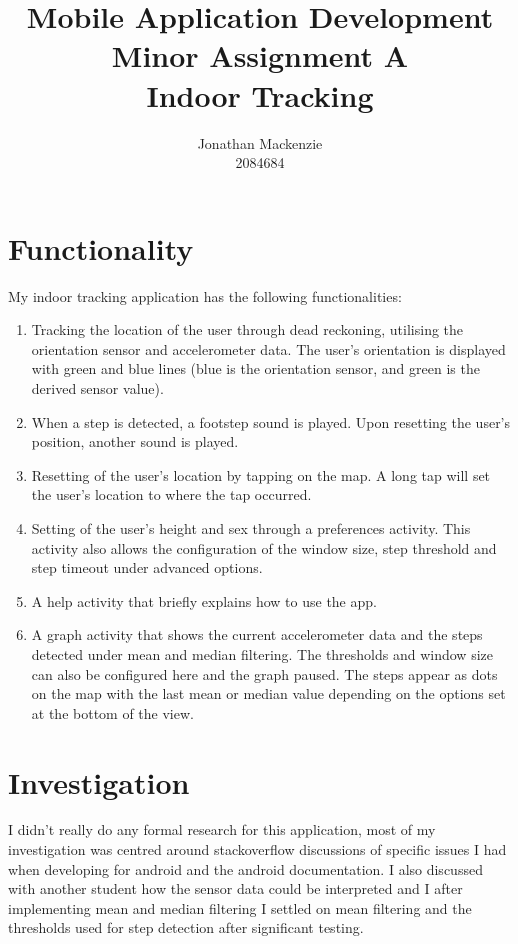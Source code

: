\documentclass[11pt]{article}
\begin{document}
\title{Mobile Application Development \\ Minor Assignment A \\ Indoor Tracking}
\author{Jonathan Mackenzie\\ 2084684}
\maketitle
\section{Functionality}
My indoor tracking application has the following functionalities: 
\begin{enumerate}
\item Tracking the location of the user through dead reckoning, utilising the orientation sensor and accelerometer data. The user's orientation is displayed with green and blue lines (blue is the orientation sensor, and green is the derived sensor value).
\item When a step is detected, a footstep sound is played. Upon resetting the user's position, another sound is played.
\item Resetting of the user's location by tapping on the map. A long tap will set the user's location to where the tap occurred.
\item Setting of the user's height and sex through a preferences activity. This activity also allows the configuration of the window size, step threshold and step timeout under advanced options.
\item A help activity that briefly explains how to use the app.
\item A graph activity that shows the current accelerometer data and the steps detected under mean and median filtering. The thresholds and window size can also be configured here and the graph paused. The steps appear as dots on the map with the last mean or median value depending on the options set at the bottom of the view.  

\end{enumerate}
\section{Investigation}
I didn't really do any formal research for this application, most of my investigation was centred around stackoverflow discussions of specific issues I had when developing for android and the android documentation. I also discussed with another student how the sensor data could be interpreted and I after implementing mean and median filtering I settled on mean filtering and the thresholds used for step detection after significant testing.
\end{document}
